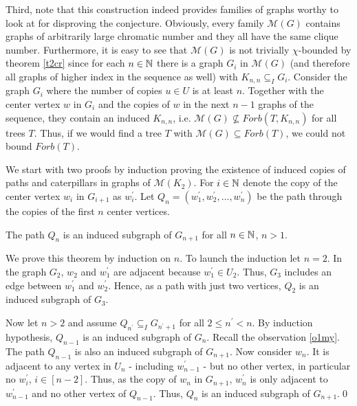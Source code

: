 Third, note that this construction indeed provides families of graphs worthy to look at for disproving the conjecture. Obviously, every family $\mathcal{M}(G)$ contains graphs of arbitrarily large chromatic number and they all have the same clique number. Furthermore, it is easy to see that $\mathcal{M}(G)$ is not trivially $\chi$-bounded by theorem \ref{t2cr} since for each $n\in\mathbb{N}$ there is a graph $G_i$ in $\mathcal{M}(G)$ (and therefore all graphs of higher index in the sequence as well) with $K_{n,n}\subseteq_I G_i$. Consider the graph $G_i$ where the number of copies $u\in U$ is at least $n$. Together with the center vertex $w$ in $G_i$ and the copies of $w$ in the next $n-1$ graphs of the sequence, they contain an induced $K_{n,n}$, i.e. $\mathcal{M}(G)\nsubseteq\textit{Forb}(T,K_{n,n})$ for all trees $T$. Thus, if we would find a tree $T$ with $\mathcal{M}(G)\subseteq \textit{Forb}(T)$, we could not bound $\textit{Forb}(T)$.

We start with two proofs by induction proving the existence of induced copies of paths and caterpillars in graphs of $\mathcal{M}(K_2)$. For $i\in\mathbb{N}$ denote the copy of the center vertex $w_i$ in $G_{i+1}$ as $w_i^\prime$. Let $Q_n =(w_1^\prime ,w_2^\prime ,\dots ,w_n^\prime)$ be the path through the copies of the first $n$ center vertices. 
\begin{thm}\label{t1my}
The path $Q_n$ is an induced subgraph of $G_{n+1}$ for all $n\in\mathbb{N}$, $n>1$.
\end{thm}
\begin{prf}
We prove this theorem by induction on $n$. To launch the induction let $n=2$. In the graph $G_2$, $w_2$ and $w^\prime_1$ are adjacent because $w^\prime_1\in U_2$. Thus, $G_3$ includes an edge between $w^\prime_1$ and $w^\prime_2$. Hence, as a path with just two vertices, $Q_2$ is an induced subgraph of $G_3$.

Now let $n>2$ and assume $Q_{n^\prime}\subseteq_I G_{n^\prime +1}$ for all $2\leq n^\prime <n$. By induction hypothesis, $Q_{n-1}$ is an induced subgraph of $G_n$. Recall the observation \ref{o1my}. The path $Q_{n-1}$ is also an induced subgraph of $G_{n+1}$. 
Now consider $w_n$. It is adjacent to any vertex in $U_n$ - including $w^\prime_{n-1}$ - but no other vertex, in particular no $w^\prime_i$, $i\in [n-2]$. Thus, as the copy of $w_n$ in $G_{n+1}$, $w^\prime_n$ is only adjacent to $w^\prime_{n-1}$ and no other vertex of $Q_{n-1}$. Thus, $Q_n$ is an induced subgraph of $G_{n+1}$.\qed
\end{prf}

